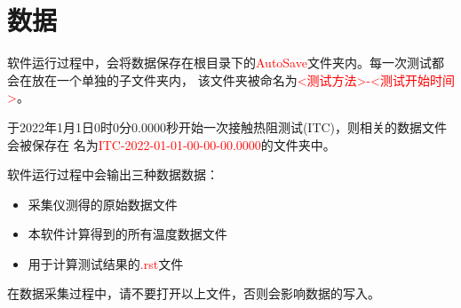 \section{数据}

软件运行过程中，会将数据保存在根目录下的\textcolor{red}{AutoSave}文件夹内。每一次测试都会在放在一个单独的子文件夹内，
该文件夹被命名为\textcolor{red}{<测试方法>-<测试开始时间>}。
\begin{example}
    于2022年1月1日0时0分0.0000秒开始一次接触热阻测试(ITC)，则相关的数据文件会被保存在
    名为\textcolor{red}{ITC-2022-01-01-00-00-00.0000}的文件夹中。
\end{example}
软件运行过程中会输出三种数据数据：
\begin{itemize}
    \item 采集仪测得的原始数据文件
    \item 本软件计算得到的所有温度数据文件
    \item 用于计算测试结果的\textcolor{red}{.rst}文件
\end{itemize}
\begin{note}
    在数据采集过程中，请不要打开以上文件，否则会影响数据的写入。
\end{note}
